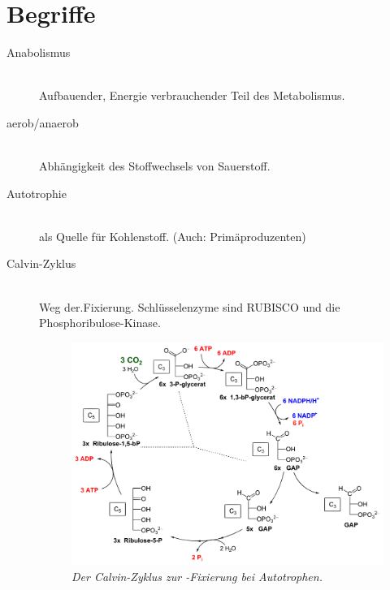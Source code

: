 \section{Begriffe}
\label{sec:facts}


\begin{description}
	\item[Anabolismus] \hfill \\
		Aufbauender, Energie verbrauchender Teil des Metabolismus.
	
	\item[aerob/anaerob]\hfill \\
		Abhängigkeit des Stoffwechsels von Sauerstoff.

	\item[Autotrophie] \hfill \\
		 als Quelle für Kohlenstoff.
		(Auch: Primäproduzenten)

	\item[Calvin-Zyklus]	\hfill \\
		Weg der.Fixierung.
		Schlüsselenzyme sind RUBISCO und die Phosphoribulose-Kinase.

		\begin{figure}[ht!]
		\leavevmode
		\begin{center}
		\includegraphics[scale=0.30]{./pictures/calvin_detail_1000}
		\end{center}
		\caption{\slshape{Der Calvin-Zyklus zur -Fixierung bei Autotrophen.}}
		\label{fig:calvinDetail}
		\end{figure}


\end{description}
